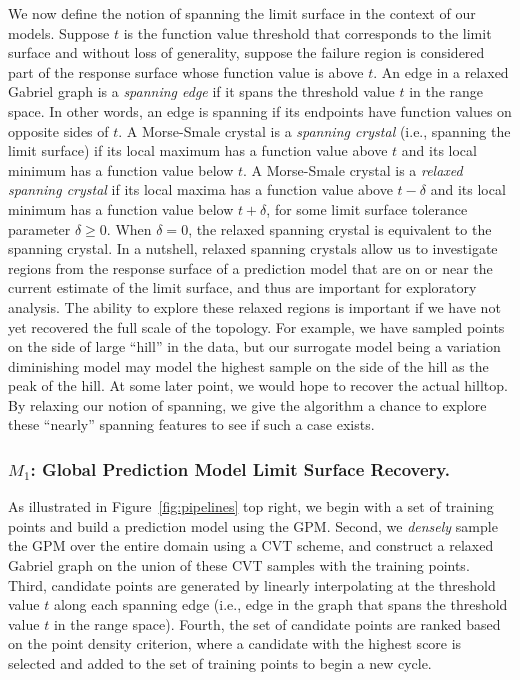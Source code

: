 We now define the notion of spanning the limit surface in the context of our models.
%
Suppose $t$ is the function value threshold that corresponds to the limit surface and without loss of generality, suppose the failure region is considered part of the response surface whose function value is above $t$.
%
An edge in a relaxed Gabriel graph is a \emph{spanning edge} if it spans the threshold value $t$ in the range space.
%
In other words, an edge is spanning if its endpoints have function values on opposite sides of $t$.
%
A Morse-Smale crystal is a \emph{spanning crystal} (i.e., spanning the limit surface) if its local maximum has a function value above $t$ and its local minimum has a function value below $t$.
%
A Morse-Smale crystal is a \emph{relaxed spanning crystal} if its local maxima has a function value above $t-\delta$ and its local minimum has a function value below $t+\delta$, for some limit surface tolerance parameter $\delta \geq 0$.
%
When $\delta = 0$, the relaxed spanning crystal is equivalent to the spanning crystal.
%
In a nutshell, relaxed spanning crystals allow us to investigate regions from the response surface of a prediction model that are on or near the current estimate of the limit surface, and thus are important for exploratory analysis.
%
The ability to explore these relaxed regions is important if we have not yet recovered the full scale of the topology.
%
For example, we have sampled points on the side of large ``hill'' in the data, but our surrogate model being a variation diminishing model may model the highest sample on the side of the hill as the peak of the hill.
%
At some later point, we would hope to recover the actual hilltop.
%
By relaxing our notion of spanning, we give the algorithm a chance to explore these ``nearly'' spanning features to see if such a case exists.
%

\subsubsection{$M_1$: Global Prediction Model Limit Surface Recovery.}
As illustrated in Figure~\ref{fig:pipelines} top right, we begin with a set of training points and build a prediction model using the GPM.
%
Second, we \emph{densely} sample the GPM over the entire domain using a CVT scheme, and construct a relaxed Gabriel graph on the union of these CVT samples with the training points.
%
Third, candidate points are generated by linearly interpolating at the threshold value $t$ along each spanning edge (i.e., edge in the graph that spans the threshold value $t$ in the range space).
%
Fourth, the set of candidate points are ranked based on the point density criterion, where a candidate with the highest score is selected and added to the set of training points to begin a new cycle.


